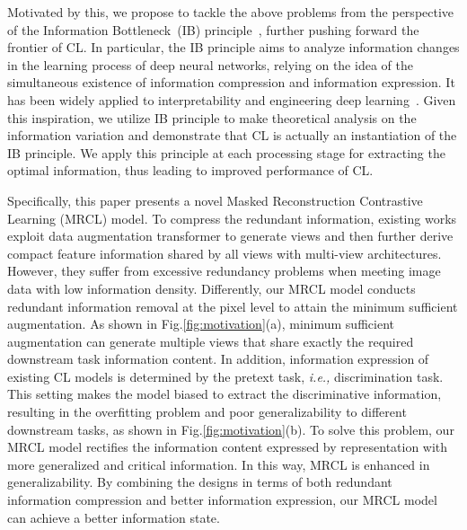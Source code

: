 \documentclass[10pt,twocolumn,letterpaper]{article}
\begin{document}
Motivated by this, we propose to tackle the above problems from the perspective of the Information Bottleneck~(IB) principle~\cite{tishby2015deep,tishby99information,shwartz2017opening}, further pushing forward the frontier of CL. In particular, the IB principle aims to analyze information changes in the learning process of deep neural networks, relying on the idea of the simultaneous existence of information compression and information expression.
It has been widely applied to interpretability and engineering deep learning~\cite{alemi2017vib,voloshynovskiy2020variational,wu2020graph,wan2021multi,gao2021information}. Given this inspiration, we utilize IB principle to make theoretical analysis on the information variation and demonstrate that CL is actually an instantiation of the IB principle. We apply this principle at each processing stage for extracting the optimal information, thus leading to improved performance of CL.

Specifically, this paper presents a novel Masked Reconstruction Contrastive Learning (MRCL) model. To compress the redundant information, existing works exploit data augmentation transformer to generate views and then further derive compact feature information shared by all views with multi-view architectures. However, they suffer from excessive redundancy problems when meeting image data with low information density.
Differently, our MRCL model conducts redundant information removal at the pixel level to attain the minimum sufficient augmentation. As shown in Fig.\ref{fig:motivation}(a), minimum sufficient augmentation can generate multiple views that share exactly the required downstream task information content. In addition, information expression of existing CL models is determined by the pretext task, \emph{i.e.,} discrimination task. This setting makes the model biased to extract the discriminative information, resulting in the overfitting problem and poor generalizability to different downstream tasks, as shown in Fig.\ref{fig:motivation}(b). To solve this problem, our MRCL model rectifies the information content expressed by representation with more generalized and critical information. In this way, MRCL is enhanced in generalizability. By combining the designs in terms of both redundant information compression and better information expression, our MRCL model can achieve a better information state. 
\end{document}
